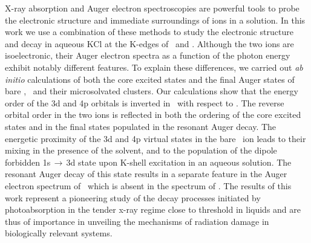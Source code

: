 X-ray absorption and Auger electron spectroscopies are powerful tools to probe the electronic structure and immediate surroundings of ions in a solution. In this work we use a combination of these methods to study the electronic structure and decay in aqueous KCl at the K-edges of \ki~and \cli. Although the two ions are isoelectronic, their Auger electron spectra as a function of the photon energy exhibit notably different features. To explain these differences, we carried out {\it ab initio} calculations of both the core excited states and the final Auger states of bare \ki, \cli~and their microsolvated clusters. Our calculations show that the energy order of the 3d and 4p orbitals is inverted in \ki~with respect to \cli. The reverse orbital order in the two ions is reflected in both the ordering of the core excited states and in the final states populated in the resonant Auger decay. The energetic proximity of the 3d and 4p virtual states in the bare \ki~ion leads to their mixing in the presence of the solvent, and to the population of the dipole forbidden 1s$\,\rightarrow\,$3d state upon K-shell excitation in an aqueous solution. The resonant Auger decay of this state results in a separate feature in the Auger electron spectrum of \ki~which is absent in the spectrum of \cli. The results of this work represent a pioneering study of the decay processes initiated by photoabsorption in the tender x-ray regime close to threshold in liquids and are thus of importance in unveiling the mechanisms of radiation damage in biologically relevant systems.
